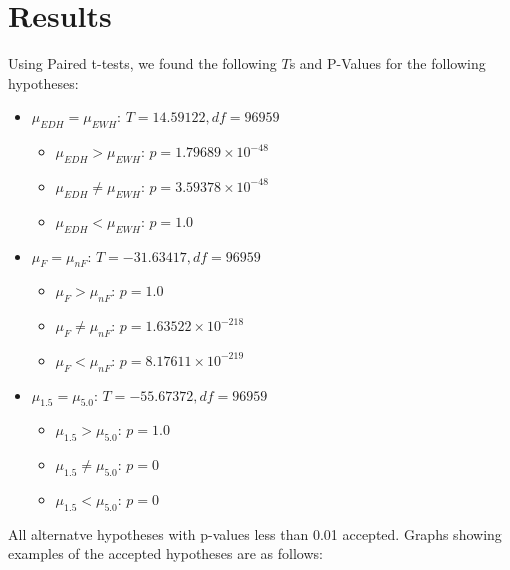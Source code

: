 \documentclass{article}
\begin{document}
\section*{Results}
Using Paired t-tests, we found the following $T$s and P-Values for the following hypotheses:
\begin{itemize}
  \item $\mu_{EDH}=\mu_{EWH}$: $T=14.59122, df = 96959$ 
  \begin{itemize}
    \item $\mu_{EDH}>\mu_{EWH}$: $p=1.79689\times10^{-48}$
    \item $\mu_{EDH}\neq\mu_{EWH}$: $p=3.59378\times10^{-48}$
    \item $\mu_{EDH}<\mu_{EWH}$: $p=1.0$
  \end{itemize}  
  \item $\mu_{F}=\mu_{nF}$: $T=-31.63417, df = 96959$
  \begin{itemize}
    \item $\mu_{F}>\mu_{nF}$: $p=1.0$
    \item $\mu_{F}\neq\mu_{nF}$: $p=1.63522\times10^{-218}$
    \item $\mu_{F}<\mu_{nF}$: $p=8.17611\times10^{-219}$
  \end{itemize}
  \item $\mu_{1.5}=\mu_{5.0}$: $T=-55.67372, df = 96959$
  \begin{itemize}
    \item $\mu_{1.5}>\mu_{5.0}$: $p=1.0$
    \item $\mu_{1.5}\neq\mu_{5.0}$: $p=0$
    \item $\mu_{1.5}<\mu_{5.0}$: $p=0$
  \end{itemize}
\end{itemize}

All alternatve hypotheses with p-values less than 0.01 accepted. Graphs showing examples of the accepted hypotheses are as follows:
\end{document}

